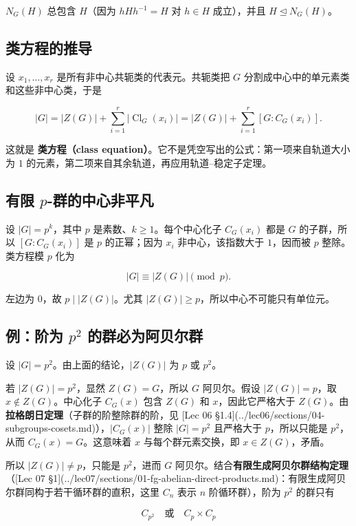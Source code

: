 $N_G(H)$ 总包含 $H$（因为 $hHh^{-1}=H$ 对 $h\in H$ 成立），并且 $H\trianglelefteq N_G(H)$。

\subsection{类方程的推导}


设 $x_1,\ldots,x_r$ 是所有非中心共轭类的代表元。共轭类把 $G$ 分割成中心中的单元素类和这些非中心类，于是

\[
|G|=|Z(G)|+\sum_{i=1}^{r}|\operatorname{Cl}_G(x_i)|
=|Z(G)|+\sum_{i=1}^{r}[G:C_G(x_i)].
\]

这就是 \textbf{类方程（class equation）}。它不是凭空写出的公式：第一项来自轨道大小为 $1$ 的元素，第二项来自其余轨道，再应用轨道--稳定子定理。

\subsection{有限 $p$-群的中心非平凡}


设 $|G|=p^k$，其中 $p$ 是素数、$k\ge 1$。每个中心化子 $C_G(x_i)$ 都是 $G$ 的子群，所以 $[G:C_G(x_i)]$ 是 $p$ 的正幂；因为 $x_i$ 非中心，该指数大于 $1$，因而被 $p$ 整除。类方程模 $p$ 化为

\[
|G|\equiv |Z(G)|\pmod p.
\]

左边为 $0$，故 $p\mid |Z(G)|$。尤其 $|Z(G)|\ge p$，所以中心不可能只有单位元。

\subsection{例：阶为 $p^2$ 的群必为阿贝尔群}


设 $|G|=p^2$。由上面的结论，$|Z(G)|$ 为 $p$ 或 $p^2$。

若 $|Z(G)|=p^2$，显然 $Z(G)=G$，所以 $G$ 阿贝尔。假设 $|Z(G)|=p$，取 $x\notin Z(G)$。中心化子 $C_G(x)$ 包含 $Z(G)$ 和 $x$，因此它严格大于 $Z(G)$。由\textbf{拉格朗日定理}（子群的阶整除群的阶，见 [Lec 06 §1.4](../lec06/sections/04-subgroups-cosets.md)），$|C_G(x)|$ 整除 $|G|=p^2$ 且严格大于 $p$，所以只能是 $p^2$，从而 $C_G(x)=G$。这意味着 $x$ 与每个群元素交换，即 $x\in Z(G)$，矛盾。

所以 $|Z(G)|\ne p$，只能是 $p^2$，进而 $G$ 阿贝尔。结合\textbf{有限生成阿贝尔群结构定理}（[Lec 07 §1](../lec07/sections/01-fg-abelian-direct-products.md)：有限生成阿贝尔群同构于若干循环群的直积，这里 $C_n$ 表示 $n$ 阶循环群），阶为 $p^2$ 的群只有

\[
C_{p^2}\quad\text{或}\quad C_p\times C_p
\]

